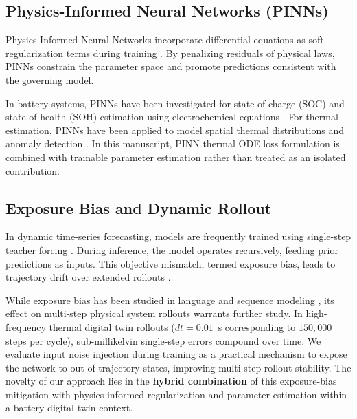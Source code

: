 \subsection{Physics-Informed Neural Networks (PINNs)}
Physics-Informed Neural Networks incorporate differential equations as soft regularization terms during training \cite{raissi2019physicsinformed}. By penalizing residuals of physical laws, PINNs constrain the parameter space and promote predictions consistent with the governing model.

In battery systems, PINNs have been investigated for state-of-charge (SOC) and state-of-health (SOH) estimation using electrochemical equations \cite{li2021physics, li2023hybrid, pollo2024coupling, ke2024physics}. For thermal estimation, PINNs have been applied to model spatial thermal distributions and anomaly detection \cite{chen2022physics, wang2024physicsinformed, ji2024physics, vairo2024physics, paoletti2024multip, ji2024realtime}. In this manuscript, PINN thermal ODE loss formulation is combined with trainable parameter estimation rather than treated as an isolated contribution.

\subsection{Exposure Bias and Dynamic Rollout}
In dynamic time-series forecasting, models are frequently trained using single-step teacher forcing \cite{ranzato2015sequence}. During inference, the model operates recursively, feeding prior predictions as inputs. This objective mismatch, termed exposure bias, leads to trajectory drift over extended rollouts \cite{ranzato2015sequence}.

While exposure bias has been studied in language and sequence modeling \cite{bengio2015scheduled}, its effect on multi-step physical system rollouts warrants further study. In high-frequency thermal digital twin rollouts ($dt = 0.01$~s corresponding to $150,000$ steps per cycle), sub-millikelvin single-step errors compound over time. We evaluate input noise injection during training as a practical mechanism to expose the network to out-of-trajectory states, improving multi-step rollout stability. The novelty of our approach lies in the \textbf{hybrid combination} of this exposure-bias mitigation with physics-informed regularization and parameter estimation within a battery digital twin context.
